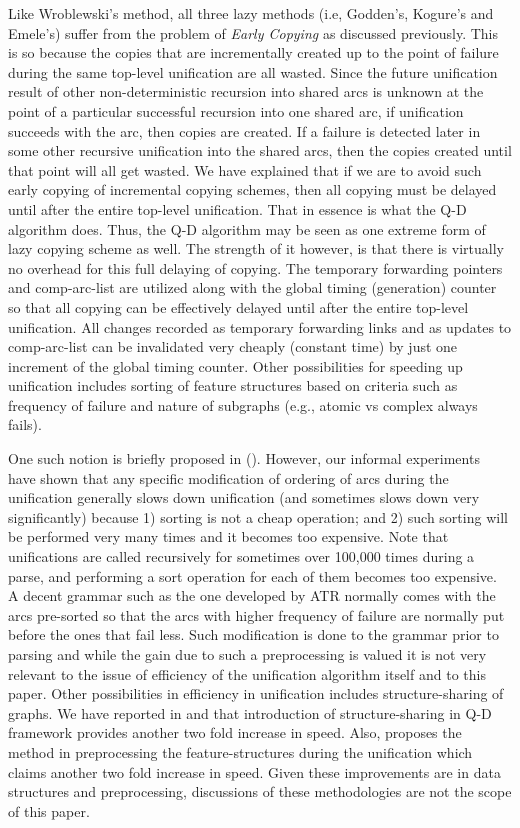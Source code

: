 Like Wroblewski's method, all three lazy methods (i.e, Godden's,
Kogure's and Emele's) suffer from the problem of {\it Early Copying}
as discussed previously. This is so because the copies that are
incrementally created up to the point of failure during the same
top-level unification are all wasted.  Since the future unification
result of other non-deterministic recursion into shared arcs is
unknown at the point of a particular successful recursion into one
shared arc, if unification succeeds with the arc, then copies are
created. If a failure is detected later in some other recursive
unification into the shared arcs, then the copies created until that
point will all get wasted.  We have explained that if we are to avoid
such early copying of incremental copying schemes, then all copying
must be delayed until after the entire top-level unification.  That in
essence is what the Q-D algorithm does. Thus, the Q-D algorithm may be
seen as one extreme form of lazy copying scheme as well. The strength
of it however, is that there is virtually no overhead for this full
delaying of copying. The temporary forwarding pointers and
comp-arc-list are utilized along with the global timing (generation)
counter so that all copying can be effectively delayed until after the
entire top-level unification.  All changes recorded as temporary
forwarding links and as updates to comp-arc-list can be invalidated
very cheaply (constant time) by just one increment of the global
timing counter.  Other possibilities for speeding up unification
includes sorting of feature structures based on criteria such as
frequency of failure and nature of subgraphs (e.g., atomic vs complex
always fails).

 One such notion is briefly proposed in (\cite{Kogure-Lazy}).
However, our informal experiments have shown that any specific
modification of ordering of arcs during the unification generally
slows down unification (and sometimes slows down very significantly)
because 1) sorting is not a cheap operation; and 2) such sorting will
be performed very many times and it becomes too expensive. Note that
unifications are called recursively for sometimes over 100,000 times
during a parse, and performing a sort operation for each of them
becomes too expensive. A decent grammar such as the one developed by
ATR normally comes with the arcs pre-sorted so that the arcs with
higher frequency of failure are normally put before the ones that fail
less. Such modification is done to the grammar prior to parsing and
while the gain due to such a preprocessing is valued it is not very
relevant to the issue of efficiency of the unification algorithm
itself and to this paper. Other possibilities in efficiency in
unification includes structure-sharing of graphs. We have reported in
\cite{quasi-str} and \cite{thesis} that introduction of
structure-sharing in Q-D framework provides another two fold increase
in speed. Also, \cite{signature} proposes the method in preprocessing
the feature-structures during the unification which claims another two
fold increase in speed. Given these improvements are in data
structures and preprocessing, discussions of these methodologies are
not the scope of this paper.

